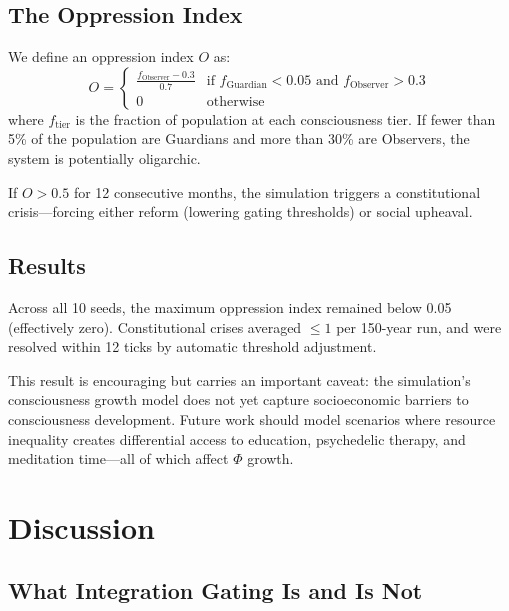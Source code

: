 \documentclass[12pt,a4paper]{article}
\begin{document}
\subsection{The Oppression Index}

We define an oppression index $O$ as:
\begin{equation}
    O = \begin{cases}
        \frac{f_\text{Observer} - 0.3}{0.7} & \text{if } f_\text{Guardian} < 0.05 \text{ and } f_\text{Observer} > 0.3 \\
        0 & \text{otherwise}
    \end{cases}
\end{equation}
where $f_\text{tier}$ is the fraction of population at each consciousness tier. If fewer than 5\% of the population are Guardians and more than 30\% are Observers, the system is potentially oligarchic.

If $O > 0.5$ for 12 consecutive months, the simulation triggers a constitutional crisis---forcing either reform (lowering gating thresholds) or social upheaval.

\subsection{Results}

Across all 10 seeds, the maximum oppression index remained below 0.05 (effectively zero). Constitutional crises averaged $\leq 1$ per 150-year run, and were resolved within 12 ticks by automatic threshold adjustment.

This result is encouraging but carries an important caveat: the simulation's consciousness growth model does not yet capture socioeconomic barriers to consciousness development. Future work should model scenarios where resource inequality creates differential access to education, psychedelic therapy, and meditation time---all of which affect $\Phi$ growth.


\section{Discussion}

\subsection{What Integration Gating Is and Is Not}
\end{document}
